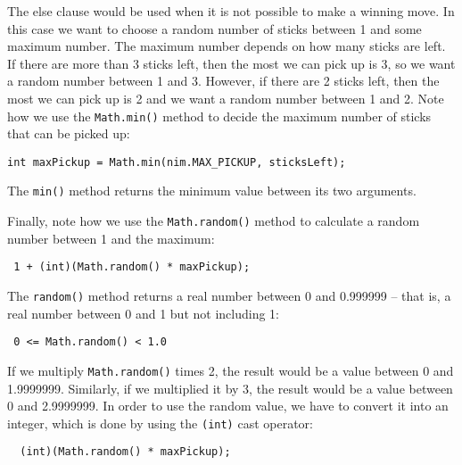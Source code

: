 The else clause would be used when it is not possible to make a winning
move.  In this case we want to choose a random number of sticks between 1
and some maximum number. The maximum number depends on how many sticks
are left. If there are more than 3 sticks left, then the most we can
pick up is 3, so we want a random number between 1 and 3. However, if
there are 2 sticks left, then the most we can pick up is 2 and we
want a random number between 1 and 2. Note how we use the {\tt Math.min()}
method to decide the maximum number of sticks that can be picked up:

\begin{jjjlisting}
\begin{lstlisting}
int maxPickup = Math.min(nim.MAX_PICKUP, sticksLeft);
\end{lstlisting}
\end{jjjlisting}

\noindent The {\tt min()} method returns the minimum value between its
two arguments. 

Finally, note how we use the {\tt Math.random()} method to calculate a
random number between 1 and the maximum:

\begin{jjjlisting}
\begin{lstlisting}
 1 + (int)(Math.random() * maxPickup);
\end{lstlisting}
\end{jjjlisting}

\noindent The {\tt random()} method returns a real number between 0 and 0.999999 --
that is, a real number between 0 and 1 but not including 1:

\begin{jjjlisting}
\begin{lstlisting}
 0 <= Math.random() < 1.0
\end{lstlisting}
\end{jjjlisting}

\noindent If we multiply {\tt Math.random()} times 2, the result would be a value
between 0 and 1.9999999.  Similarly, if we multiplied it by 3, the result would
be a value between 0 and 2.9999999.  In order to use the random value, we have
to convert it into an integer, which is done by using the {\tt (int)} cast operator:

\begin{jjjlisting}
\begin{lstlisting}
  (int)(Math.random() * maxPickup);
\end{lstlisting}
\end{jjjlisting}

